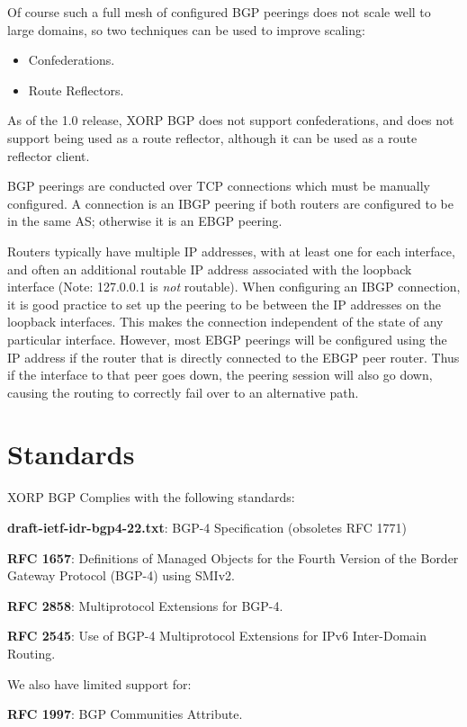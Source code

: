 Of course such a full mesh of configured BGP peerings does not scale
well to large domains, so two techniques can be used to improve
scaling:
\begin{itemize}
\item Confederations.
\item Route Reflectors.
\end{itemize}
As of the 1.0 release, XORP BGP does not support confederations, and
does not support being used as a route reflector, although it can be
used as a route reflector client.

BGP peerings are conducted over TCP connections which must be manually
configured.  A connection is an IBGP peering if both routers are
configured to be in the same AS; otherwise it is an EBGP peering.

Routers typically have multiple IP addresses, with at least one for
each interface, and often an additional routable IP address associated
with the loopback interface (Note: 127.0.0.1 is {\it not} routable).
When configuring an IBGP connection, it is good practice to set up the
peering to be between the IP addresses on the loopback interfaces.
This makes the connection independent of the state of any particular
interface.  However, most EBGP peerings will be configured using the
IP address if the router that is directly connected to the EBGP peer
router.  Thus if the interface to that peer goes down, the peering
session will also go down, causing the routing to correctly fail over
to an alternative path.

\section{Standards}

XORP BGP Complies with the following standards:
\begin{description}
\item{\bf draft-ietf-idr-bgp4-22.txt}: BGP-4 Specification (obsoletes RFC 1771)
\item{\bf RFC 1657}: Definitions of Managed Objects for the Fourth Version
     of the Border Gateway Protocol (BGP-4) using SMIv2.
\item{\bf RFC 2858}: Multiprotocol Extensions for BGP-4.
\item{\bf RFC 2545}: Use of BGP-4 Multiprotocol Extensions for IPv6
     Inter-Domain Routing.
\end{description}

\noindent We also have limited support for:
\begin{description}
\item{\bf RFC 1997}: BGP Communities Attribute.
\end{description}

